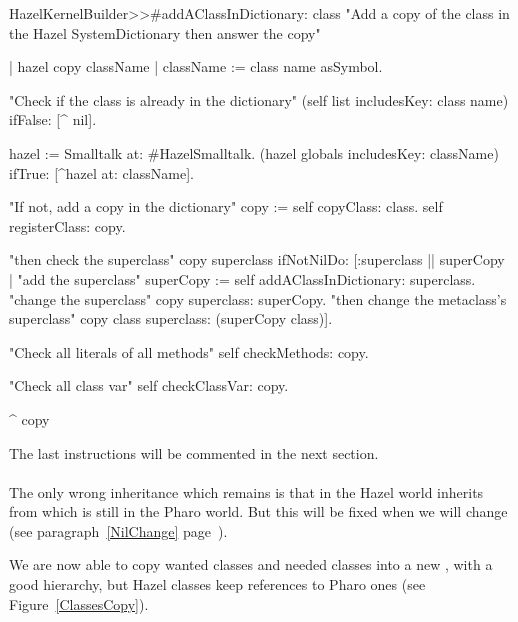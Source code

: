 	\begin{code}{}
		HazelKernelBuilder>>\#addAClassInDictionary: class
		"Add a copy of the class in the Hazel SystemDictionary then answer the copy"

		\tab| hazel copy className |
		\tab className := class name asSymbol.
	
		\tab"Check if the class is already in the dictionary"
		\tab(self list includesKey: class name) 
		\tab\tab	ifFalse: [^ nil].
	
		\tab hazel := Smalltalk at: #HazelSmalltalk.
		\tab(hazel globals includesKey: className) 
		\tab\tab	ifTrue: [^hazel at: className].

		\tab"If not, add a copy in the dictionary"
		\tab copy := self copyClass: class.
		\tab self registerClass: copy.

		\tab"then check the superclass"
		\tab copy superclass ifNotNilDo: [:superclass || superCopy | 
		\tab\tab	"add the superclass"
		\tab\tab	superCopy := self addAClassInDictionary: superclass.
		\tab\tab	"change the superclass"
		\tab\tab	copy superclass: superCopy.
		\tab\tab	"then change the metaclass's superclass"
		\tab\tab	copy class superclass: (superCopy class)].
	
		\tab"Check all literals of all methods"
		\tab self checkMethods: copy.
	
		\tab"Check all class var"
		\tab self checkClassVar: copy.
	
		\tab ^ copy
	\end{code}
	The last instructions will be commented in the next section.
	
	\paragraph{}The only wrong inheritance which remains is that  in the Hazel world inherits from  which is still in the \gls{Pharo} world. But this will be fixed when we will change  (see paragraph~\ref{NilChange} page~\pageref{NilChange}).


\inanutshell We are now able to copy wanted classes and needed classes into a new , with a good hierarchy, but Hazel classes keep references to \gls{Pharo} ones (see Figure~\ref{ClassesCopy}). 


\newpage